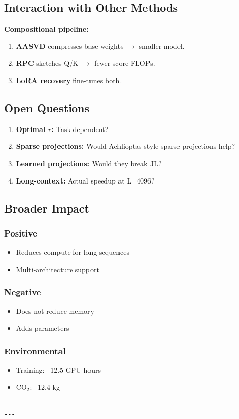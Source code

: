 \subsection{Interaction with Other Methods}

\textbf{Compositional pipeline:}

\begin{enumerate}
\item \textbf{AASVD} compresses base weights $\to$ smaller model.
\item \textbf{RPC} sketches Q/K $\to$ fewer score FLOPs.
\item \textbf{LoRA recovery} fine-tunes both.

\end{enumerate}
\subsection{Open Questions}

\begin{enumerate}
\item \textbf{Optimal $r$:} Task-dependent?
\item \textbf{Sparse projections:} Would Achlioptas-style sparse projections help?
\item \textbf{Learned projections:} Would they break JL?
\item \textbf{Long-context:} Actual speedup at L=4096?

\end{enumerate}
\subsection{Broader Impact}

\subsubsection{Positive}
\begin{itemize}
\item Reduces compute for long sequences
\item Multi-architecture support

\end{itemize}
\subsubsection{Negative}
\begin{itemize}
\item Does not reduce memory
\item Adds parameters

\end{itemize}
\subsubsection{Environmental}
\begin{itemize}
\item Training: ~12.5 GPU-hours
\item CO$_2$: ~12.4 kg
\end{itemize}
\begin{lstlisting}

---
\end{lstlisting}